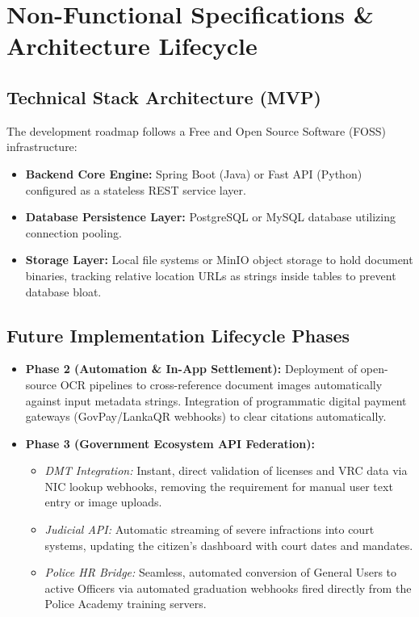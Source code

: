 \documentclass[12pt, a4paper]{article}
\begin{document}
\section{Non-Functional Specifications \& Architecture Lifecycle}

\subsection{Technical Stack Architecture (MVP)}
The development roadmap follows a Free and Open Source Software (FOSS) infrastructure:
\begin{itemize}
    \item \textbf{Backend Core Engine:} Spring Boot (Java) or Fast API (Python) configured as a stateless REST service layer.
    \item \textbf{Database Persistence Layer:} PostgreSQL or MySQL database utilizing connection pooling.
    \item \textbf{Storage Layer:} Local file systems or MinIO object storage to hold document binaries, tracking relative location URLs as strings inside tables to prevent database bloat.
\end{itemize}

\subsection{Future Implementation Lifecycle Phases}
\begin{itemize}
    \item \textbf{Phase 2 (Automation \& In-App Settlement):} Deployment of open-source OCR pipelines to cross-reference document images automatically against input metadata strings. Integration of programmatic digital payment gateways (GovPay/LankaQR webhooks) to clear citations automatically.
    \item \textbf{Phase 3 (Government Ecosystem API Federation):}
    \begin{itemize}
        \item \textit{DMT Integration:} Instant, direct validation of licenses and VRC data via NIC lookup webhooks, removing the requirement for manual user text entry or image uploads.
        \item \textit{Judicial API:} Automatic streaming of severe infractions into court systems, updating the citizen's dashboard with court dates and mandates.
        \item \textit{Police HR Bridge:} Seamless, automated conversion of General Users to active Officers via automated graduation webhooks fired directly from the Police Academy training servers.
    \end{itemize}
\end{itemize}
\end{document}
